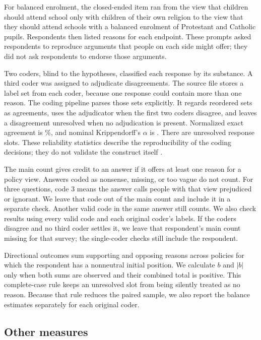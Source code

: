 \documentclass{article}
\begin{document}
For balanced enrolment, the closed-ended item ran from the view that children should attend
school only with children of their own religion to the view that they should attend schools
with a balanced enrolment of Protestant and Catholic pupils. Respondents then listed reasons
for each endpoint. These prompts asked respondents to reproduce arguments that people on each
side might offer; they did not ask respondents to endorse those arguments.

Two coders, blind to the hypotheses, classified each response by its substance. A third coder
was assigned to adjudicate disagreements. The source file stores a label set from each coder,
because one response could contain more than one reason. The coding pipeline parses those
sets explicitly. It regards reordered sets as agreements, uses the adjudicator when the first
two coders disagree, and leaves a disagreement unresolved when no adjudication is present.
Normalized exact agreement is \CoderAgreement\%, and nominal Krippendorff's $\alpha$ is
\CoderAlpha{}. There are \UnresolvedSlots{} unresolved response slots. These reliability
statistics describe the reproducibility of the coding decisions; they do not validate the
construct itself \citep{krippendorff1980content,krippendorff1986information,
krippendorff2004content}.

The main count gives credit to an answer if it offers at least one reason for a policy view.
Answers coded as nonsense, missing, or too vague do not count. For three questions, code 3 means
the answer calls people with that view prejudiced or ignorant. We leave that code out of the
main count and include it in a separate check. Another valid code in the same answer still
counts. We also check results using every valid code and each original coder's labels. If the
coders disagree and no third coder settles it, we leave that respondent's main count missing
for that survey; the single-coder checks still include the respondent.

Directional outcomes sum supporting and opposing reasons across policies for which the
respondent has a nonneutral initial position. We calculate $b$ and $|b|$ only when both sums
are observed and their combined total is positive. This complete-case rule keeps an unresolved
slot from being silently treated as no reason. Because that rule reduces the paired sample, we
also report the balance estimates separately for each original coder.

\subsection{Other measures}
\end{document}
